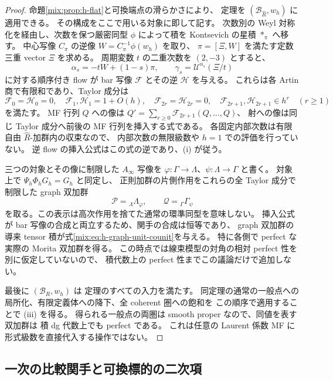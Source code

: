 \begin{proof}
命題\ref{mix:prop:h-flat}と可換端点の滑らかさにより、
定理を $(\mathscr B_{\widehat R},w_h)$ に適用できる。
その構成をここで用いる対象に即して記す。
次数別の Weyl 対称化を経由し、次数を保つ厳密同型 $\phi$ によって積を
Kontsevich の星積 $*_\pi$ へ移す。
中心写像 $C_\pi$ の逆像 $W=C_\pi^{-1}\phi(w_h)$ を取り、
$\pi=[\Xi,W]$ を満たす定数三重 vector $\Xi$ を求める。
周期変数 $t$ の二重次数を $(2,-3)$ とすると、
\[
 \alpha_s=-tW+(1-s)\pi,\qquad
 \gamma_s=\mathcal U^{\alpha_s}(\Xi/t)
\]
に対する順序付き flow が bar 写像 $\mathcal F$ とその逆 $\mathcal H$ を与える。
これらは各 Artin 商で有限和であり、Taylor 成分は
\[
 \mathcal F_0=\mathcal H_0=0,\quad
 \mathcal F_1,\mathcal H_1=1+O(h),\quad
 \mathcal F_{2r}=\mathcal H_{2r}=0,\quad
 \mathcal F_{2r+1},\mathcal H_{2r+1}\in h^r\quad(r\ge1)
\]
を満たす。
MF 行列 $Q$ への像は
$Q'=\sum_{r\ge0}\mathcal F_{2r+1}(Q,\ldots,Q)$、
射への像は同じ Taylor 成分へ前後の MF 行列を挿入する式である。
各固定内部次数は有限自由 $\widehat R$-加群内の収束なので、
内部次数の無限級数や $h=1$ での評価を行っていない。
逆 flow の挿入公式はこの式の逆であり、(i) が従う。

三つの対象とその像に制限した $A_\infty$ 写像を
$\varphi:\Gamma\to\Lambda$、$\psi:\Lambda\to\Gamma$ と書く。
対象上で $\Psi_h\Phi_hG_h=G_h$ と同定し、
正則加群の片側作用をこれらの全 Taylor 成分で制限した graph 双加群
\[
 \mathcal P={}_{\Lambda}\Lambda_{\varphi},\qquad
 \mathcal Q={}_{\Gamma}\Gamma_{\psi}
\]
を取る。この表示は高次作用を捨てた通常の環準同型を意味しない。
挿入公式が bar 写像の合成と両立するため、関手の合成は恒等であり、
graph 双加群の導来 tensor 積が式\eqref{mix:eq:h-graph-unit-counit}を与える。
特に各側で perfect な実際の Morita 双加群を得る。
この時点では線束模型の対角の相対 perfect 性を別に仮定していないので、
積代数上の perfect 性までこの議論だけで追加しない。

最後に $(\mathscr B_R,w_h)$ は
定理のすべての入力を満たす。
同定理の通常の一般点への局所化、有限定義体への降下、全 coherent 圏への飽和を
この順序で適用することで (iii) を得る。
得られる一般点の両圏は smooth proper なので、同値を表す双加群は
積 dg 代数上でも perfect である。
これは任意の Laurent 係数 MF に形式級数を直接代入する操作ではない。
\end{proof}

\subsection{一次の比較関手と可換標的の二次項}

